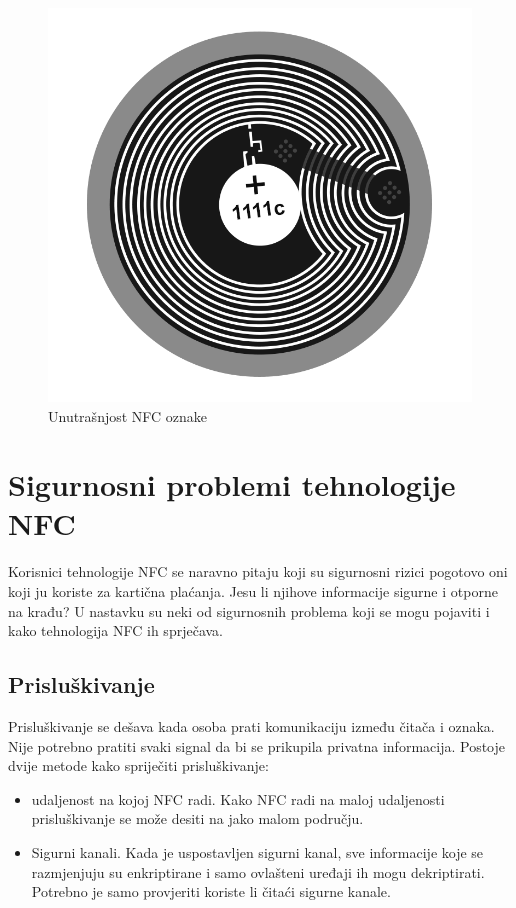 \documentclass[times, utf8, zavrsni]{fer}
\begin{document}
\begin{figure}[h]
\includegraphics[scale=0.2]{nfctag.png}
\centering
\caption[]{Unutrašnjost NFC oznake \citep{5}}
\centering
\end{figure}

\section{Sigurnosni problemi tehnologije NFC}
Korisnici tehnologije NFC se naravno pitaju koji su sigurnosni rizici pogotovo oni koji ju koriste za kartična plaćanja. Jesu li njihove informacije sigurne i otporne na krađu? U nastavku su neki od sigurnosnih problema koji se mogu pojaviti i kako tehnologija NFC ih sprječava.
\subsection{Prisluškivanje}
Prisluškivanje se dešava kada osoba prati komunikaciju između čitača i oznaka. Nije potrebno pratiti svaki signal da bi se prikupila privatna informacija. Postoje dvije metode kako spriječiti prisluškivanje:
\begin{itemize}
\item udaljenost na kojoj NFC radi. Kako NFC radi na maloj udaljenosti prisluškivanje se može desiti na jako malom području.
\item Sigurni kanali. Kada je uspostavljen sigurni kanal, sve informacije koje se razmjenjuju su enkriptirane i samo ovlašteni uređaji ih mogu dekriptirati. Potrebno je samo provjeriti koriste li čitaći sigurne kanale.
\end{itemize}
\end{document}
